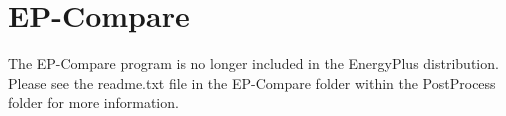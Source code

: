 \section{EP-Compare}\label{ep-compare}

The EP-Compare program is no longer included in the EnergyPlus distribution. Please see the readme.txt file in the EP-Compare folder within the PostProcess folder for more information.

